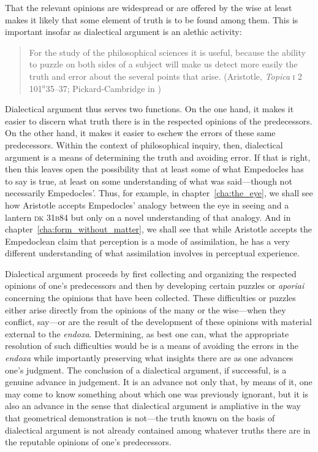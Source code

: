 That the relevant opinions are widespread or are offered by the wise at least makes it likely that some element of truth is to be found among them. This is important insofar as dialectical argument is an alethic activity:
\begin{quote}
	For the study of the philosophical sciences it is useful, because the ability to puzzle on both sides of a subject will make us detect more easily the truth and error about the several points that arise. (Aristotle, \emph{Topica} \textsc{i} 2 101\( ^{a} \)35--37; Pickard-Cambridge in \citealt[3--4]{Barnes:1984uq})
\end{quote}
Dialectical argument thus serves two functions. On the one hand, it makes it easier to discern what truth there is in the respected opinions of the predecessors. On the other hand, it makes it easier to eschew the errors of these same predecessors. Within the context of philosophical inquiry, then, dialectical argument is a means of determining the truth and avoiding error. If that is right, then this leaves open the possibility that at least some of what Empedocles has to say is true, at least on some understanding of what was said---though not necessarily Empedocles'. Thus, for example, in chapter~\ref{cha:the_eye}, we shall see how Aristotle accepts Empedocles' analogy between the eye in seeing and a lantern \textsc{dk} 31\textsc{b}84 but only on a novel understanding of that analogy. And in chapter~\ref{cha:form_without_matter}, we shall see that while Aristotle accepts the Empedoclean claim that perception is a mode of assimilation, he has a very different understanding of what assimilation involves in perceptual experience.

Dialectical argument proceeds by first collecting and organizing the respected opinions of one's predecessors and then by developing certain puzzles or \emph{aporiai} concerning the opinions that have been collected. These difficulties or puzzles either arise directly from the opinions of the many or the wise---when they conflict, say---or are the result of the development of these opinions with material external to the \emph{endoxa}. Determining, as best one can, what the appropriate resolution of such difficulties would be is a means of avoiding the errors in the \emph{endoxa} while importantly preserving what insights there are as one advances one's judgment. The conclusion of a dialectical argument, if successful, is a genuine advance in judgement. It is an advance not only that, by means of it, one may come to know something about which one was previously ignorant, but it is also an advance in the sense that dialectical argument is ampliative in the way that geometrical demonstration is not---the truth known on the basis of dialectical argument is not already contained among whatever truths there are in the reputable opinions of one's predecessors.

